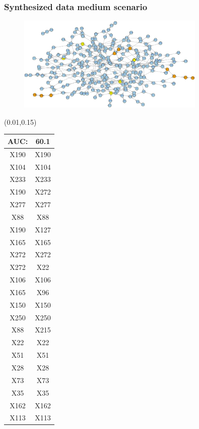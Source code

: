 \documentclass{beamer}
\newcommand{\boz}{\cellcolor{pathwaynode}}
\newcommand{\ghool}{\cellcolor{independentnode}}
\begin{document}
\begin{frame}[plain]
  \frametitle{Synthesized data medium scenario}
  \begin{figure}
    \includegraphics[width=0.8\textwidth]{synthesized-medium}
  \end{figure}
  \begin{textblock*}{\paperwidth}(0.01\textwidth,0.15\textheight)
    \raggedright 
    \tiny
    \begin{tabular}{| c c |}
      \hline
AUC: & 60.1 \\ \hline \hline
\boz X190   &  \boz X190  \\ \hline
X104   &  X104  \\ \hline
X233   &  X233  \\ \hline
\boz X190   &  \boz X272  \\ \hline
X277   &  X277  \\ \hline
\ghool X88   &  \ghool X88  \\ \hline
\boz X190   &  X127  \\ \hline
X165   &  X165  \\ \hline
\boz X272   &  \boz X272  \\ \hline
\boz X272   &  \boz X22  \\ \hline
X106   &  X106  \\ \hline
X165   &  \ghool X96  \\ \hline
\boz X150   &  \boz X150  \\ \hline
X250   &  X250  \\ \hline
\ghool X88   &  X215  \\ \hline
\boz X22   &  \boz X22  \\ \hline
X51   &  X51  \\ \hline
X28   &  X28  \\ \hline
X73   &  X73  \\ \hline
X35   &  X35  \\ \hline
X162   &  X162  \\ \hline
\boz X113   &  \boz X113  \\ \hline

\end{tabular}
\end{textblock*}
\end{frame}
\end{document}
